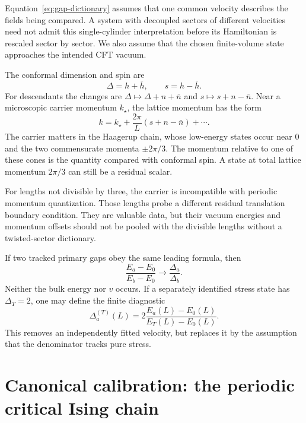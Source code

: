 Equation~\eqref{eq:gap-dictionary} assumes that one common velocity describes
the fields being compared. A system with decoupled sectors of different
velocities need not admit this single-cylinder interpretation before its
Hamiltonian is rescaled sector by sector. We also assume that the chosen
finite-volume state approaches the intended CFT vacuum.

The conformal dimension and spin are
\[
 \Delta=h+\bar h,\qquad s=h-\bar h.
\]
For descendants the changes are $\Delta\mapsto\Delta+n+\bar n$ and
$s\mapsto s+n-\bar n$. Near a microscopic carrier momentum $k_\star$, the
lattice momentum has the form
\begin{equation}
 k=k_\star+\frac{2\pi}{L}(s+n-\bar n)+\cdots.
 \label{eq:carrier-spin}
\end{equation}
The carrier matters in the Haagerup chain, whose low-energy states occur
near $0$ and the two commensurate momenta $\pm2\pi/3$. The momentum
relative to one of these cones is the quantity compared with conformal
spin. A state at total lattice momentum $2\pi/3$ can still be a residual
scalar.

For lengths not divisible by three, the carrier is incompatible with
periodic momentum quantization. Those lengths probe a different residual
translation boundary condition. They are valuable data, but their vacuum
energies and momentum offsets should not be pooled with the divisible
lengths without a twisted-sector dictionary.

\begin{example}
If two tracked primary gaps obey the same leading formula, then
\[
 \frac{E_a-E_0}{E_b-E_0}\longrightarrow\frac{\Delta_a}{\Delta_b}.
\]
Neither the bulk energy nor $v$ occurs. If a separately identified stress
state has $\Delta_T=2$, one may define the finite diagnostic
\[
 \Delta_a^{(T)}(L)=2\frac{E_a(L)-E_0(L)}{E_T(L)-E_0(L)}.
\]
This removes an independently fitted velocity, but replaces it by the
assumption that the denominator tracks pure stress.
\end{example}

\section{Canonical calibration: the periodic critical Ising chain}
\label{sec:scaling-Ising}

